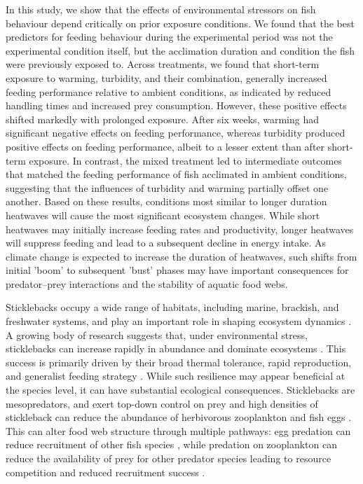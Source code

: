 \documentclass[ASNA,twocolumn]{USG} %
\begin{document}
In this study, we show that the effects of environmental stressors on fish behaviour depend critically on prior exposure conditions. We found that the best predictors for feeding behaviour during the experimental period was not the experimental condition itself, but the acclimation duration and condition the fish were previously exposed to. Across treatments, we found that short-term exposure to warming, turbidity, and their combination, generally increased feeding performance relative to ambient conditions, as indicated by reduced handling times and increased prey consumption. However, these positive effects shifted markedly with prolonged exposure. After six weeks, warming had significant negative effects on feeding performance, whereas turbidity produced positive effects on feeding performance, albeit to a lesser extent than after short-term exposure. In contrast, the mixed treatment led to intermediate outcomes that matched the feeding performance of fish acclimated in ambient conditions, suggesting that the influences of turbidity and warming partially offset one another. Based on these results, conditions most similar to longer duration heatwaves will cause the most significant ecosystem changes. While short heatwaves may initially increase feeding rates and productivity, longer heatwaves will suppress feeding and lead to a subsequent decline in energy intake. As climate change is expected to increase the duration of heatwaves, such shifts from initial 'boom' to subsequent 'bust' phases may have important consequences for predator–prey interactions and the stability of aquatic food webs. 

Sticklebacks occupy a wide range of habitats, including marine, brackish, and freshwater systems, and play an important role in shaping ecosystem dynamics \citep{olinIncreasesOpportunisticSpecies2022}. A growing body of research suggests that, under environmental stress, sticklebacks can increase rapidly in abundance and dominate ecosystems \citep[e.g.][]{bretzelFeedingEcologyInvasive2021,jakobsentsImpactThreespinedStickleback2003}. This success is primarily driven by their broad thermal tolerance, rapid reproduction, and generalist feeding strategy \citep{olinIncreasesOpportunisticSpecies2022}. While such resilience may appear beneficial at the species level, it can have substantial ecological consequences. Sticklebacks are mesopredators, and exert top-down control on prey and high densities of stickleback can reduce the abundance of herbivorous zooplankton and fish eggs \citep{jakobsentsImpactThreespinedStickleback2003, erikssonDeclinesPredatoryFish2009, siebenCascadingEffectsPredator2011, siebenMesopredatorReleaseStickleback2011, candolinEnvironmentalDisturbanceAlters2018}. This can alter food web structure through multiple pathways: egg predation can reduce recruitment of other fish species \citep{kotterbaPredationThreespineStickleback2014, bystromDecliningCoastalPiscivore2015, nilssonPredatorPreyRole2019, donadiPerchPikeRecruitment2020}, while predation on zooplankton can reduce the availability of prey for other predator species leading to resource competition and reduced recruitment success \citep{ljunggrenRecruitmentFailureCoastal2010, bretzelFeedingEcologyInvasive2021}. 
\end{document}
